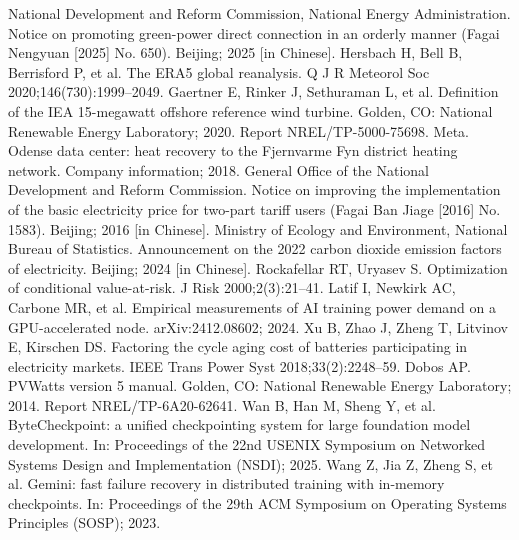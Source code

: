  National Development and Reform Commission, National Energy Administration. Notice on promoting green-power direct connection in an orderly manner (Fagai Nengyuan [2025] No. 650). Beijing; 2025 [in Chinese].
 Hersbach H, Bell B, Berrisford P, et al. The ERA5 global reanalysis. Q J R Meteorol Soc 2020;146(730):1999--2049.
 Gaertner E, Rinker J, Sethuraman L, et al. Definition of the IEA 15-megawatt offshore reference wind turbine. Golden, CO: National Renewable Energy Laboratory; 2020. Report NREL/TP-5000-75698.
 Meta. Odense data center: heat recovery to the Fjernvarme Fyn district heating network. Company information; 2018.
 General Office of the National Development and Reform Commission. Notice on improving the implementation of the basic electricity price for two-part tariff users (Fagai Ban Jiage [2016] No. 1583). Beijing; 2016 [in Chinese].
 Ministry of Ecology and Environment, National Bureau of Statistics. Announcement on the 2022 carbon dioxide emission factors of electricity. Beijing; 2024 [in Chinese].
 Rockafellar RT, Uryasev S. Optimization of conditional value-at-risk. J Risk 2000;2(3):21--41.
 Latif I, Newkirk AC, Carbone MR, et al. Empirical measurements of AI training power demand on a GPU-accelerated node. arXiv:2412.08602; 2024.
 Xu B, Zhao J, Zheng T, Litvinov E, Kirschen DS. Factoring the cycle aging cost of batteries participating in electricity markets. IEEE Trans Power Syst 2018;33(2):2248--59.
 Dobos AP. PVWatts version 5 manual. Golden, CO: National Renewable Energy Laboratory; 2014. Report NREL/TP-6A20-62641.
 Wan B, Han M, Sheng Y, et al. ByteCheckpoint: a unified checkpointing system for large foundation model development. In: Proceedings of the 22nd USENIX Symposium on Networked Systems Design and Implementation (NSDI); 2025.
 Wang Z, Jia Z, Zheng S, et al. Gemini: fast failure recovery in distributed training with in-memory checkpoints. In: Proceedings of the 29th ACM Symposium on Operating Systems Principles (SOSP); 2023.
